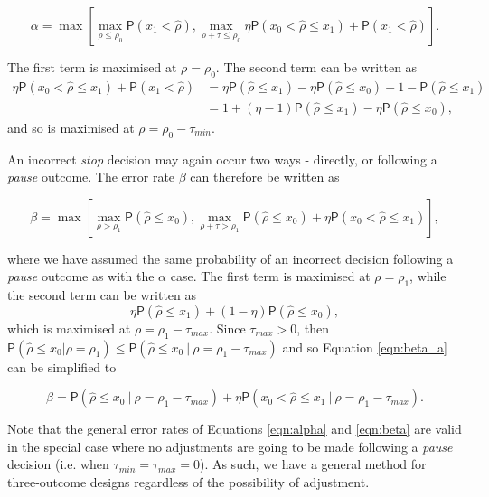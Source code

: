 \documentclass{bmcart}
\newcommand{\PR}{{\mathsf P}}
\begin{document}
\begin{equation}\label{eqn:alpha}
\alpha = \max \left[ \max_{\rho \leq \rho_0} \PR(x_1 < \hat{\rho}), \max_{\rho + \tau \leq \rho_0} \eta \PR(x_0 < \hat{\rho} \leq x_1) + \PR(x_1 < \hat{\rho}) \right].
\end{equation}

The first term is maximised at $\rho = \rho_0$. The second term can be written as
$$
\begin{aligned}
\eta \PR(x_0 < \hat{\rho} \leq x_1) + \PR(x_1 < \hat{\rho}) &=
\eta \PR(\hat{\rho} \leq x_1) - \eta \PR(\hat{\rho} \leq x_0) + 1 - \PR(\hat{\rho} \leq x_1)\\
&= 1 + (\eta - 1)\PR(\hat{\rho} \leq x_1) - \eta \PR(\hat{\rho} \leq x_0),
\end{aligned}
$$
and so is maximised at $\rho = \rho_0 - \tau_{min}$.

An incorrect \emph{stop} decision may again occur two ways - directly, or following a \emph{pause} outcome. The error rate $\beta$ can therefore be written as

\begin{equation}\label{eqn:beta_a}
\beta = \max \left[ \max_{\rho > \rho_1} \PR(\hat{\rho} \leq x_0), \max_{\rho + \tau > \rho_1} \PR(\hat{\rho} \leq x_0) + \eta \PR(x_0 < \hat{\rho} \leq x_1) \right],
\end{equation}

where we have assumed the same probability of an incorrect decision following a \emph{pause} outcome as with the $\alpha$ case. The first term is maximised at $\rho = \rho_1$, while the second term can be written as
$$
\eta \PR(\hat{\rho} \leq x_1) + (1 - \eta) \PR(\hat{\rho} \leq x_0),
$$
which is maximised at $\rho = \rho_1 - \tau_{max}$. Since $\tau_{max} > 0$, then $\PR(\hat{\rho} \leq x_0 | \rho = \rho_1) \leq \PR(\hat{\rho} \leq x_0 ~|~ \rho = \rho_1  - \tau_{max})$ and so Equation \ref{eqn:beta_a} can be simplified to

\begin{equation}\label{eqn:beta}
\beta = \PR(\hat{\rho} \leq x_0 ~|~ \rho = \rho_1 - \tau_{max}) + \eta \PR(x_0 < \hat{\rho} \leq x_1 ~|~ \rho = \rho_1 - \tau_{max}).
\end{equation}

Note that the general error rates of Equations \ref{eqn:alpha} and \ref{eqn:beta} are valid in the special case where no adjustments are going to be made following a \emph{pause} decision (i.e. when $\tau_{min} = \tau_{max} = 0$). As such, we have a general method for three-outcome designs regardless of the possibility of adjustment. 
\end{document}
